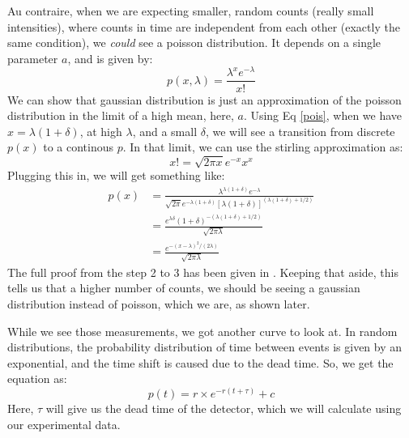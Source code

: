 \documentclass{double}
\begin{document}
\begin{multicols*}{2}
Au contraire, when we are expecting smaller, random counts (really small intensities), where counts in time are independent from each other (exactly the same condition), we \emph{could} see a poisson distribution. It depends on a single parameter $a$, and is given by:
\begin{equation}
	p(x,\lambda) = \frac{\lambda^x e^{-\lambda}}{x!}
	\label{pois}
\end{equation}
We can show that gaussian distribution is just an approximation of the poisson distribution in the limit of a high mean, here, $a$. Using Eq \ref{pois}, when we have $x = \lambda(1+\delta)$, at high $\lambda$, and a small $\delta$, we will see a transition from discrete $p(x)$ to a continous $p$. In that limit, we can use the stirling approximation as:
\begin{equation}
	x! = \sqrt{2\pi x}e^{-x}x^x
\end{equation}
Plugging this in, we will get something like:
\begin{align}
	p(x) &= \frac{\lambda^{\lambda(1+\delta)}e^{-\lambda}}{\sqrt{2\pi}e^{-\lambda(1+\delta)}[\lambda(1+\delta)]^{(\lambda(1+\delta) + 1/2)}}\nonumber\\
	&= \frac{e^{\lambda\delta}(1+\delta)^{-(\lambda(1+\delta) + 1/2)}}{\sqrt{2\pi\lambda}}\nonumber\\
	&= \frac{e^{-(x-\lambda)^2/(2\lambda)}}{\sqrt{2\pi\lambda}}
\end{align}
The full proof from the step 2 to 3 has been given in \cite{pgauss}. Keeping that aside, this tells us that a higher number of counts, we should be seeing a gaussian distribution instead of poisson, which we are, as shown later.

While we see those measurements, we got another curve to look at. In random distributions, the probability distribution of time between events is given by an exponential, and the time shift is caused due to the dead time. So, we get the equation as:
\begin{equation}
	p(t) = r \times e^{-r(t+\tau)} + c
\end{equation}
Here, $\tau$ will give us the dead time of the detector, which we will calculate using our experimental data.


\end{multicols*}
\end{document}
